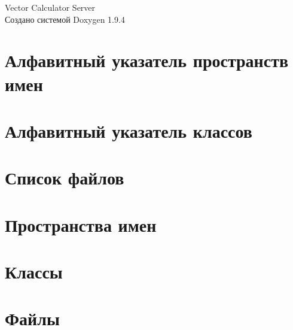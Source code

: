 \documentclass[twoside]{book}
\newcommand{\+}{\discretionary{\mbox{\scriptsize$\hookleftarrow$}}{}{}}
\newcommand{\clearemptydoublepage}{%
    \newpage{\pagestyle{empty}\cleardoublepage}%
  }
\begin{document}
  \raggedbottom
    \hypersetup{pageanchor=false,
                bookmarksnumbered=true,
                pdfencoding=unicode
               }
  \begin{titlepage}
  \vspace*{7cm}
  \begin{center}%
  {\Large Vector Calculator Server}\\
  \vspace*{1cm}
  {\large Создано системой Doxygen 1.9.4}\\
  \end{center}
  \end{titlepage}
  \clearemptydoublepage
  \tableofcontents
  \clearemptydoublepage
  \hypersetup{pageanchor=true}
\chapter{Алфавитный указатель пространств имен}

\chapter{Алфавитный указатель классов}

\chapter{Список файлов}

\chapter{Пространства имен}

\chapter{Классы}






\chapter{Файлы}


















  \backmatter
  \newpage
  \clearemptydoublepage
  \printindex
\end{document}
